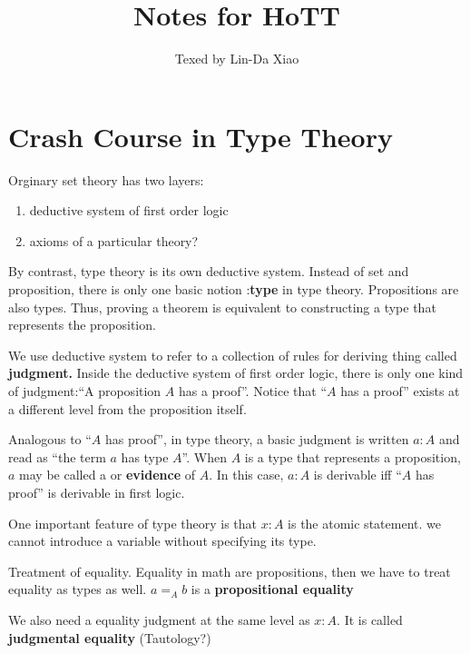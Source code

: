 \documentclass[11pt]{article}
\title{\bf Notes for HoTT}
\author{Texed by Lin-Da Xiao} %
\begin{document}
\maketitle
\tableofcontents
\newpage
\section{Crash Course in Type Theory}
Orginary set theory has two layers:
\begin{enumerate}
	\item deductive system of first order logic
	\item axioms of a particular theory?
\end{enumerate}

By contrast, type theory is its own deductive system. Instead of set and proposition, there is only one basic notion :\textbf{type} in type theory. Propositions are also types. Thus, proving a theorem is equivalent to constructing a type that represents the proposition.

We use deductive system to refer to a collection of rules for deriving thing called \textbf{judgment.} Inside the deductive system of first order logic, there is only one kind of judgment:``A proposition $A$ has a proof''. Notice that ``$A$ has a proof'' exists at a different level from the proposition itself.

Analogous to ``$A$ has  proof'', in type theory, a basic judgment is written $a:A$ and read as ``the term $a$ has type $A$''. When $A$ is a type that represents a proposition, $a$ may be called a  or \textbf{evidence} of $A$. In this case, $a:A$ is derivable iff ``$A$ has  proof'' is derivable in first logic. 

One important feature of type theory is that $x:A$ is the atomic statement. we cannot introduce a variable without specifying its type.

Treatment of equality. Equality in math are propositions, then we have to treat equality as types as well. $a=_A b$ is a \textbf{propositional equality} 

We also need a equality judgment at the same level as $x:A$. It is called \textbf{judgmental equality} (Tautology?)
\end{document}
